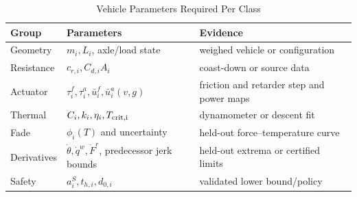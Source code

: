 \begin{table}[t]
\caption{Vehicle Parameters Required Per Class}
\label{tab:parameters}
\centering\normalsize
\begin{tabular}{@{}>{\raggedright\arraybackslash}p{}>{\raggedright\arraybackslash}p{}>{\raggedright\arraybackslash}p{}@{}}
\toprule
Group & Parameters & Evidence \\
\midrule
Geometry & $m_i,L_i$, axle/load state & weighed vehicle or configuration \\
Resistance & $c_{r,i},C_{d,i}A_i$ & coast-down or source data \\
Actuator & $\tau_i^f,\tau_i^a,\bar u_i^f,\bar u_i^a(v,g)$ & friction and retarder step and power maps \\
Thermal & $C_i,k_i,\eta_i,T_{\rm crit,i}$ & dynamometer or descent fit \\
Fade & $\phi_i(T)$ and uncertainty & held-out force--temperature curve \\
Derivatives & $\dot\theta,\dot q^w,\dot F^r$, predecessor jerk bounds & held-out extrema or certified limits \\
Safety & $a_i^S,t_{h,i},d_{0,i}$ & validated lower bound/policy \\
\bottomrule
\end{tabular}
\end{table}
